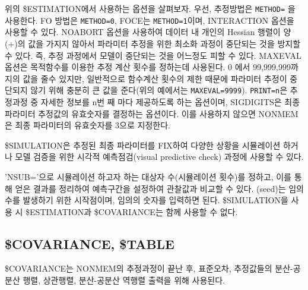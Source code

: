\documentclass[
  10pt,
  krantz2,
  a4paper]{krantz}
\newenvironment{Shaded}{\begin{snugshade}}{\end{snugshade}}
\newcommand{\DecValTok}[1]{\textcolor[rgb]{0.00,0.00,0.81}{#1}}
\newcommand{\KeywordTok}[1]{\textcolor[rgb]{0.13,0.29,0.53}{\textbf{#1}}}
\newcommand{\NormalTok}[1]{#1}
\newcommand{\OperatorTok}[1]{\textcolor[rgb]{0.81,0.36,0.00}{\textbf{#1}}}
\theoremstyle{definition}
\theoremstyle{definition}
\theoremstyle{definition}
\theoremstyle{remark}
\begin{document}
위의 \$ESTIMATION에서 사용하는 옵션을 살펴보자. 우선, 추정방법은 \texttt{METHOD=} 을 사용한다. FO 방법은 \texttt{METHOD=0}, FOCE는 \texttt{METHOD=1}이며, INTERACTION 옵션을 사용할 수 있다. NOABORT 옵션을 사용하여 데이터 내 개인의 Hessian 행렬이 양(+)의 값을 가지지 않아서 파라미터 추정을 위한 최소화 과정이 중단되는 것을 방지할 수 있다. 즉, 추정 과정에서 모델이 중단되는 것을 어느정도 피할 수 있다. MAXEVAL 옵션은 목적함수를 이용한 추정 계산 횟수를 정하는데 사용된다. 0 에서 99,999,999까지의 값을 줄수 있지만, 일반적으로 함수계산 횟수의 제한 때문에 파라미터 추정이 중단되지 않기 위해 충분히 큰 값을 준다(위의 예에서는 \texttt{MAXEVAL=9999}). \texttt{PRINT=n}은 추정과정 중 자세한 정보를 n번 째 마다 제공하도록 하는 옵션이며, SIGDIGITS은 최종 파라미터 추정값의 유효숫자를 결정하는 옵션이다. 이를 사용하지 않으면 NONMEM은 최종 파라미터의 유효숫자를 3으로 지정한다.

\$SIMULATION은 추정된 최종 파라미터를 FIX하여 다양한 상황을 시뮬레이션 하거나 모델 검증을 위한 시각적 예측점검(visual predictive check) 과정에 사용할 수 있다.

\begin{Shaded}
\end{Shaded}

'NSUB='으로 시뮬레이션 하고자 하는 대상자 수(시뮬레이션 횟수)를 정하고, 이를 통해 얻은 결과를 정리하여 예측구간을 설정하여 관찰값과 비교할 수 있다. (seed)는 임의 수를 발생하기 위한 시작점이며, 임의의 숫자를 입력하면 된다. \$SIMULATION을 사용 시 \$ESTIMATION과 \$COVARIANCE는 함께 사용할 수 없다.

\hypertarget{covariance-table}{%
\subsection{\$COVARIANCE, \$TABLE}\label{covariance-table}}

\$COVARIANCE는 NONMEM의 추정과정이 끝난 후, 표준오차, 추정값들의 분산-공분산 행렬, 상관행렬, 분산-공분산 역행렬 출력을 위해 사용된다.
\end{document}
